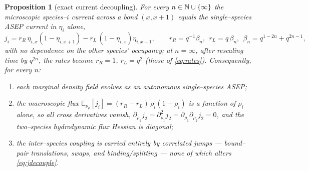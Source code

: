 \documentclass[11pt]{article}
\theoremstyle{plain}
\newtheorem{proposition}[theorem]{Proposition}
\theoremstyle{definition}
\theoremstyle{remark}
\newcommand{\E}{\mathbb{E}}\newcommand{\PP}{\mathbb{P}}\newcommand{\dd}{\,\mathrm{d}}
\begin{document}
\begin{proposition}[exact current decoupling]\label{prop:decouple}
For every $n\in\mathbb{N}\cup\{\infty\}$ the microscopic species--$i$ current across a bond
$(x,x{+}1)$ equals the single--species ASEP current in $\eta_i$ alone,
\begin{equation}\label{eq:jdecouple}
  j_i=r_R\,\eta_{i,x}(1-\eta_{i,x+1})-r_L\,(1-\eta_{i,x})\eta_{i,x+1},
  \qquad r_R=q^{-1}\beta_n,\ \ r_L=q\,\beta_n,\ \ \beta_n=q^{1-2n}+q^{2n-1},
\end{equation}
with no dependence on the other species' occupancy; at $n=\infty$, after rescaling time
by $q^{2n}$, the rates become $r_R=1$, $r_L=q^2$ (those of \eqref{eq:rates}).
Consequently, for every $n$:
\begin{enumerate}
\item[\textup{(a)}] each marginal density field evolves as an \underline{autonomous}
single--species ASEP;
\item[\textup{(b)}] the macroscopic flux $\E_{\nu_\rho}[j_i]=(r_R-r_L)\,\rho_i(1-\rho_i)$
is a function of $\rho_i$ alone, so all cross derivatives vanish,
$\partial_{\rho_1}j_2=\partial^2_{\rho_1}j_2=\partial_{\rho_1}\partial_{\rho_2}j_2=0$,
and the two--species hydrodynamic flux Hessian is diagonal;
\item[\textup{(c)}] the inter--species coupling is carried entirely by correlated
jumps --- bound--pair translations, swaps, and binding/splitting --- none of which
alters \eqref{eq:jdecouple}.
\end{enumerate}
\end{proposition}
\end{document}
